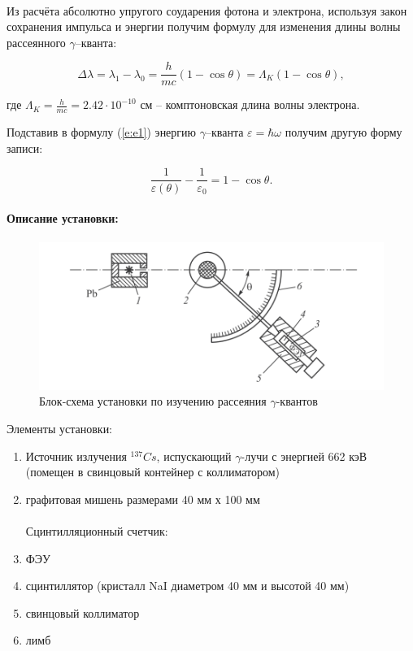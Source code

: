 \documentclass[a4paper,12pt]{article}
\begin{document}
\paragraph{} Из расчёта абсолютно упругого соударения фотона и электрона, используя закон сохранения импульса и энергии получим формулу для изменения длины волны рассеянного $\gamma$--кванта:

\begin{equation}
\Delta \lambda = \lambda_1 - \lambda_0 = \frac{h}{mc}(1 - \cos{\theta}) = \Lambda_{K}(1 - \cos{\theta}), 
\label{e:e1}
\end{equation}

\noindent где $\Lambda_{K} = \frac{h}{mc} = 2.42 \cdot 10^{-10}$ см -- комптоновская длина волны электрона.

Подставив в формулу (\ref{e:e1}) энергию $\gamma$--кванта $\varepsilon = \hbar \omega$ получим другую форму записи:

\begin{equation}
\frac{1}{\varepsilon(\theta)} - \frac{1}{\varepsilon_0} = 1 - \cos{\theta}.
\label{e:e2}
\end{equation}
\paragraph{Описание установки:}
\paragraph{}
\begin{figure}[h!]
\centering
\includegraphics[scale=0.6]{setup.png}
\caption{Блок-схема установки по изучению рассеяния $\gamma$-квантов}
\end{figure} 

Элементы установки: 
\begin{enumerate}
\itemsep0em
\item Источник излучения $^{137}Cs$, испускающий $\gamma$-лучи с энергией 662 кэВ (помещен в свинцовый контейнер с коллиматором)
\item графитовая мишень размерами 40 мм х 100 мм
\\\\
Сцинтилляционный счетчик:

\item ФЭУ
\item сцинтиллятор (кристалл NaI диаметром 40 мм и высотой 40 мм)
\item  свинцовый коллиматор
\\
\item лимб
\end{enumerate}
\end{document}
